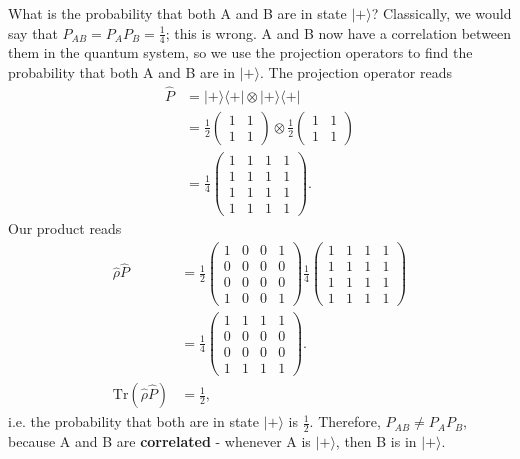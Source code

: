 \documentclass[a4paper, 11pt, normalem]{report}
\begin{document}
\begin{example}
    What is the probability that both A and B are in state $|+\rangle$?
    Classically, we would say that $P_{AB}=P_AP_B=\frac14$; this is wrong.
    A and B now have a correlation between them in the quantum system, so we use the projection operators to find the probability that both A and B are in $|+\rangle$.
    The projection operator reads
    \begin{align}
        \hat{P} &= |+\rangle\langle+| \otimes |+\rangle\langle+| \\
                &= \frac12\begin{pmatrix}1 & 1 \\ 1 & 1\end{pmatrix} \otimes \frac12\begin{pmatrix}1 & 1 \\ 1 & 1\end{pmatrix} \\
                &= \frac14\begin{pmatrix} 1&1&1&1\\1&1&1&1\\1&1&1&1\\1&1&1&1\end{pmatrix}.
    \end{align}
    Our product reads
    \begin{align}
        \hat{\rho}\hat{P} &= \frac12 \begin{pmatrix} 1 & 0 & 0 & 1 \\ 0 &0&0 & 0 \\ 0 & 0 & 0 & 0 \\ 1 & 0 & 0 & 1\end{pmatrix} \frac14\begin{pmatrix} 1&1&1&1\\1&1&1&1\\1&1&1&1\\1&1&1&1\end{pmatrix}\\
                          &= \frac14\begin{pmatrix} 1&1&1&1\\0&0&0&0\\0&0&0&0\\1&1&1&1\end{pmatrix}.\\
        \text{Tr}(\hat{\rho}\hat{P}) &= \frac12,
    \end{align}
    i.e. the probability that both are in state $|+\rangle$ is $\frac12$.
    Therefore, $P_{AB}\neq P_AP_B$, because A and B are \textbf{correlated} - whenever A is $|+\rangle$, then B is in $|+\rangle$.
\end{example}
\end{document}
